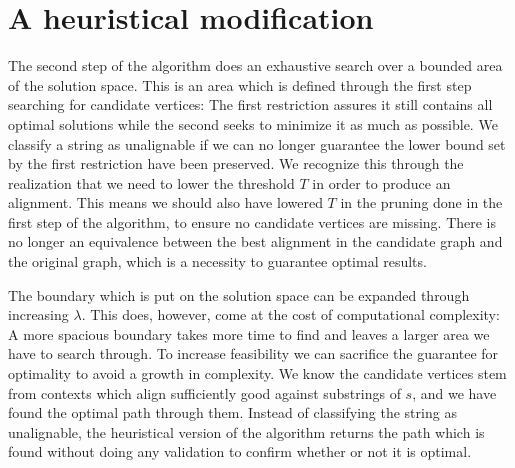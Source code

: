 \documentclass[thesis.tex]{subfiles}
\begin{document}
\section{A heuristical modification}
\label{sec:heuristical_conceptual}
The second step of the algorithm does an exhaustive search over a bounded area of the solution space. This is an area which is defined through the first step searching for candidate vertices: The first restriction assures it still contains all optimal solutions while the second seeks to minimize it as much as possible. We classify a string as unalignable if we can no longer guarantee the lower bound set by the first restriction have been preserved. We recognize this through the realization that we need to lower the threshold $T$ in order to produce an alignment. This means we should also have lowered $T$ in the pruning done in the first step of the algorithm, to ensure no candidate vertices are missing. There is no longer an equivalence between the best alignment in the candidate graph and the original graph, which is a necessity to guarantee optimal results.\\
\par\noindent
The boundary which is put on the solution space can be expanded through increasing $\lambda$. This does, however, come at the cost of computational complexity: A more spacious boundary takes more time to find and leaves a larger area we have to search through. To increase feasibility we can sacrifice the guarantee for optimality to avoid a growth in complexity. We know the candidate vertices stem from contexts which align sufficiently good against substrings of $s$, and we have found the optimal path through them. Instead of classifying the string as unalignable, the heuristical version of the algorithm returns the path which is found without doing any validation to confirm whether or not it is optimal.
\end{document}

